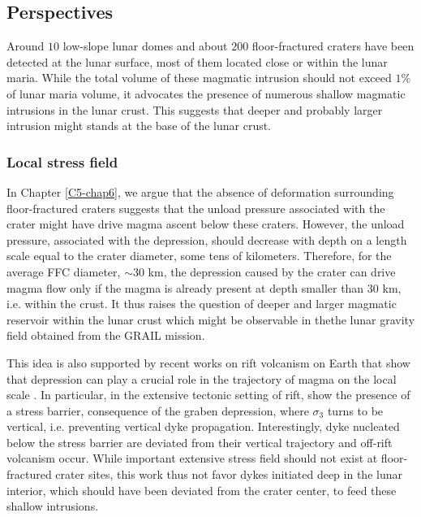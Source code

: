 \subsection*{Perspectives}
\label{sec:perspectives-2}


Around  $10$ low-slope  lunar  domes and  about $200$  floor-fractured
craters have been detected at the  lunar surface, most of them located
close  or within  the lunar  maria. While  the total  volume of  these
magmatic intrusion should  not exceed $1\%$ of lunar  maria volume, it
advocates the presence of numerous  shallow magmatic intrusions in the
lunar crust. This  suggests that deeper and  probably larger intrusion
might stands at the base of the lunar crust.

\subsubsection*{Local stress field}
\label{sec:crust-magm-intr}

In Chapter  \ref{C5-chap6}, we argue  that the absence  of deformation
surrounding floor-fractured craters suggests  that the unload pressure
associated with the  crater might have drive magma  ascent below these
craters. However, the unload pressure, associated with the depression,
should  decrease with  depth on  a length  scale equal  to the  crater
diameter, some  tens of  kilometers.  Therefore,  for the  average FFC
diameter, $\sim 30$ km, the depression  caused by the crater can drive
magma flow only if the magma  is already present at depth smaller than
$30$ km, i.e.  within the crust. It thus raises the question of deeper
and larger  magmatic reservoir within  the lunar crust which  might be
observable  in thethe lunar  gravity field  obtained from  the GRAIL
mission.

This idea is also supported by recent works on rift volcanism on Earth
that show that depression can play a crucial role in the trajectory of
magma on the local scale \citep{Maccaferri:2014ft}.  In particular, in
the extensive tectonic setting of rift, \citet{Maccaferri:2014ft} show
the  presence  of   a  stress  barrier,  consequence   of  the  graben
depression, where  $\sigma_3$ turns  to be vertical,  i.e.  preventing
vertical dyke  propagation.  Interestingly,  dyke nucleated  below the
stress  barrier  are  deviated  from  their  vertical  trajectory  and
off-rift  volcanism occur.   While  important  extensive stress  field
should not exist  at floor-fractured crater sites, this  work thus not
favor dykes  initiated deep in  the lunar interior, which  should have
been  deviated  from   the  crater  center,  to   feed  these  shallow
intrusions.

